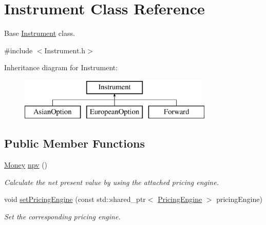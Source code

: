\hypertarget{class_instrument}{}\section{Instrument Class Reference}
\label{class_instrument}


Base \hyperlink{class_instrument}{Instrument} class.  




{\ttfamily \#include $<$Instrument.\+h$>$}

Inheritance diagram for Instrument\+:\begin{figure}[H]
\begin{center}
\leavevmode
\includegraphics[height=2.000000cm]{class_instrument}
\end{center}
\end{figure}
\subsection*{Public Member Functions}
\begin{DoxyCompactItemize}
\item 
\hyperlink{_name_def_8h_a5a9d48c16a694e9a2d9f1eca730dc8c5}{Money} \hyperlink{class_instrument_aa750f2ae95a21d65a073da3171e8d084}{npv} ()
\begin{DoxyCompactList}\small\item\em Calculate the net present value by using the attached pricing engine. \end{DoxyCompactList}\item 
void \hyperlink{class_instrument_a47bdaa9390ab5e0616e8499a507c50cd}{set\+Pricing\+Engine} (const std\+::shared\+\_\+ptr$<$ \hyperlink{class_pricing_engine}{Pricing\+Engine} $>$ pricing\+Engine)
\begin{DoxyCompactList}\small\item\em Set the corresponding pricing engine. \end{DoxyCompactList}\end{DoxyCompactItemize}
